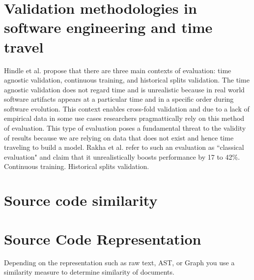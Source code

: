 \documentclass[\main/thesis.tex]{subfiles}
\begin{document}

\section{Validation methodologies in software engineering and time travel}
Hindle et al. propose that there are three main contexts of evaluation: time agnostic validation, continuous training, and historical splits validation. The time agnostic validation does not regard time and is unrealistic because in real world software artifacts appears at a particular time and in a specific order during software evolution. This context enables cross-fold validation and due to a lack of empirical data in some use cases researchers pragmattically rely on this method of evaluation. This type of evaluation poses a fundamental threat to the validity of results because we are relying on data that does not exist and hence time traveling to build a model. Rakha et al. refer to such an evaluation as ``classical evaluation" and claim that it unrealistically boosts performance by 17 to 42\%.
Continuous training. %
Historical splits validation.%

 

\section{Source code similarity}
\section{Source Code Representation}
Depending on the representation such as raw text, AST, or Graph you use a similarity measure to determine similarity of documents.
\end{document}
